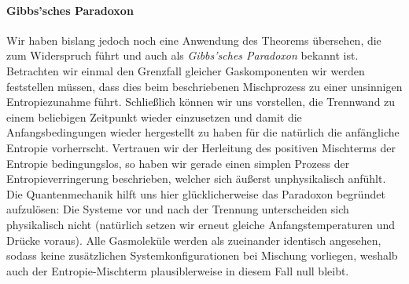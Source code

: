 \paragraph*{Gibbs'sches Paradoxon}
Wir haben bislang jedoch noch eine Anwendung des Theorems übersehen, die zum Widerspruch führt und auch als \emph{Gibbs'sches Paradoxon} bekannt ist.
Betrachten wir einmal den Grenzfall gleicher Gaskomponenten \textendash{} wir werden feststellen müssen, dass dies beim beschriebenen Mischprozess zu einer unsinnigen Entropiezunahme führt. Schließlich können wir uns vorstellen, die Trennwand zu einem beliebigen Zeitpunkt wieder einzusetzen und damit die Anfangsbedingungen wieder hergestellt zu haben \textendash{} für die natürlich die anfängliche Entropie vorherrscht. Vertrauen wir der Herleitung des positiven Mischterms der Entropie bedingungslos, so haben wir gerade einen simplen Prozess der Entropieverringerung beschrieben, welcher sich äußerst unphysikalisch anfühlt. Die Quantenmechanik hilft uns hier glücklicherweise das Paradoxon begründet aufzulösen: Die Systeme vor und nach der Trennung unterscheiden sich physikalisch nicht (natürlich setzen wir erneut gleiche Anfangstemperaturen und Drücke voraus). Alle Gasmoleküle werden als zueinander identisch angesehen, sodass keine zusätzlichen Systemkonfigurationen bei Mischung vorliegen, weshalb auch der Entropie-Mischterm plausiblerweise in diesem Fall null bleibt. 
	
